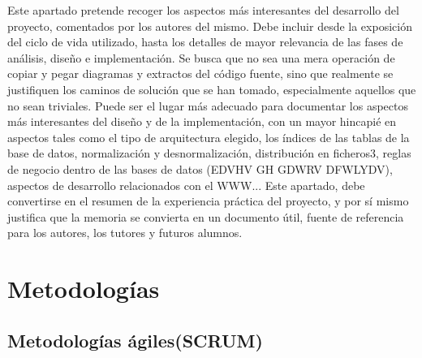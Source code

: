 
Este apartado pretende recoger los aspectos más interesantes del desarrollo del proyecto, comentados por los autores del mismo.
Debe incluir desde la exposición del ciclo de vida utilizado, hasta los detalles de mayor relevancia de las fases de análisis, diseño e implementación.
Se busca que no sea una mera operación de copiar y pegar diagramas y extractos del código fuente, sino que realmente se justifiquen los caminos de solución que se han tomado, especialmente aquellos que no sean triviales.
Puede ser el lugar más adecuado para documentar los aspectos más interesantes del diseño y de la implementación, con un mayor hincapié en aspectos tales como el tipo de arquitectura elegido, los índices de las tablas de la base de datos, normalización y desnormalización, distribución en ficheros3, reglas de negocio dentro de las bases de datos (EDVHV GH GDWRV DFWLYDV), aspectos de desarrollo relacionados con el WWW...
Este apartado, debe convertirse en el resumen de la experiencia práctica del proyecto, y por sí mismo justifica que la memoria se convierta en un documento útil, fuente de referencia para los autores, los tutores y futuros alumnos.

\section{Metodologías}

\subsection{Metodologías ágiles(SCRUM)}

